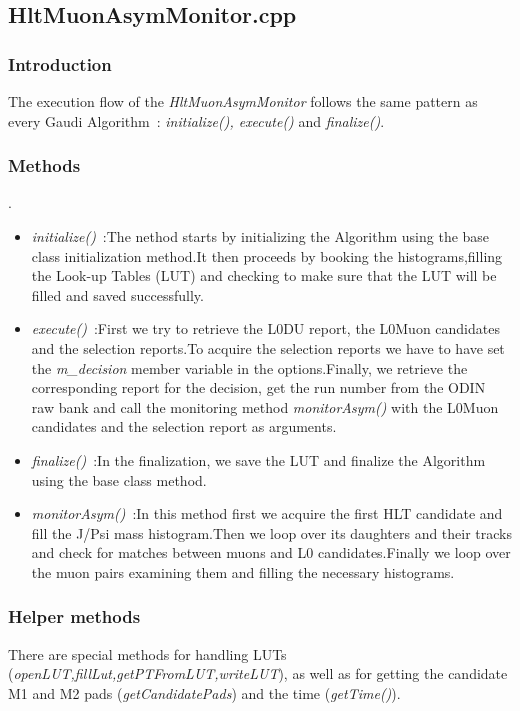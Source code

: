 \subsection{\textbf{HltMuonAsymMonitor.cpp}}

\subsubsection{\textbf{Introduction}}
The execution flow of the \textit{HltMuonAsymMonitor} follows the same pattern as every Gaudi Algorithm~: \textit{initialize(), execute()} and \textit{finalize()}.\par
\subsubsection{\textbf{Methods}}.
\begin{itemize}
\item \textit{initialize()}~:The nethod starts by initializing the Algorithm using the base class initialization method.It then proceeds by booking the histograms,filling the Look-up Tables (LUT) and checking to make sure that the LUT will be filled and saved successfully.\par
\item \textit{execute()}~:First we try to retrieve the L0DU report, the L0Muon candidates and the selection reports.To acquire the selection reports we have to have set the \textit{m\_decision} member variable in the options.Finally, we retrieve the corresponding report for the decision, get the run number from the ODIN raw bank and call the monitoring method \textit{monitorAsym()} with the L0Muon candidates and the selection report as arguments.\par
\item \textit{finalize()}~:In the finalization, we save the LUT and finalize the Algorithm using the base class method.\par
\item \textit{monitorAsym()}~:In this method first we acquire the first HLT candidate and fill the J/Psi mass histogram.Then we loop over its daughters and their tracks and check for matches between muons and L0 candidates.Finally we loop over the muon pairs examining them and filling the necessary histograms.\par

\end{itemize}

\subsubsection{\textbf{Helper methods}}
There are special methods for handling LUTs (\textit{openLUT,fillLut,getPTFromLUT,writeLUT}), as well as for getting the candidate M1 and M2 pads (\textit{getCandidatePads}) and the time (\textit{getTime()}).\par


